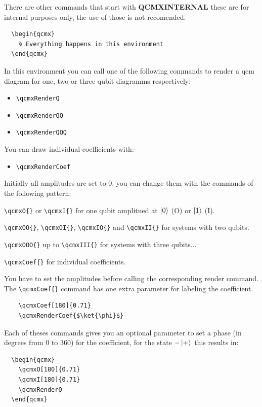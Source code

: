 \documentclass{article}
\begin{document}
There are other commands that start with \textbf{QCMXINTERNAL} these are for internal purposes only,
the use of those is not recomended.

\begin{verbatim}
  \begin{qcmx}
    % Everything happens in this environment
  \end{qcmx}
\end{verbatim}
In this environment you can call one of the following commands to render a qcm diagram 
for one, two or three qubit diagramms respectively:
\begin{itemize}
  \item \verb|\qcmxRenderQ|
  \item \verb|\qcmxRenderQQ|
  \item \verb|\qcmxRenderQQQ|
\end{itemize}

You can draw individual coefficients with:
\begin{itemize}
  \item \verb|\qcmxRenderCoef|
\end{itemize}

Initially all amplitudes are set to 0,
you can change them with the commands of the following pattern:

\verb|\qcmxO{}| or \verb|\qcmxI{}| for one qubit amplitued at $\ket{0}$ (O) or $\ket{1}$ (I).

\verb|\qcmxOO{}|, \verb|\qcmxOI{}|, \verb|\qcmxIO{}| and \verb|\qcmxII{}| for systems with two qubits.

\verb|\qcmxOOO{}| up to \verb|\qcmxIII{}| for systems with three qubits...

\verb|\qcmxCoef{}| for individual coefficients.

You have to set the amplitudes before calling the corresponding render command.
The \verb|\qcmxCoef{}| command has one extra parameter for labeling the coefficient.
\begin{lstlisting}
    \qcmxCoef[180]{0.71}
    \qcmxRenderCoef{$\ket{\phi}$}
\end{lstlisting}

Each of theses commands gives you an optional parameter to set a phase (in degrees from 0 to 360) for the coefficient,
for the state $-\ket{+}$ this results in:
\begin{lstlisting}
  \begin{qcmx}
    \qcmxO[180]{0.71}
    \qcmxI[180]{0.71}
    \qcmxRenderQ
  \end{qcmx}
\end{lstlisting}
\end{document}
